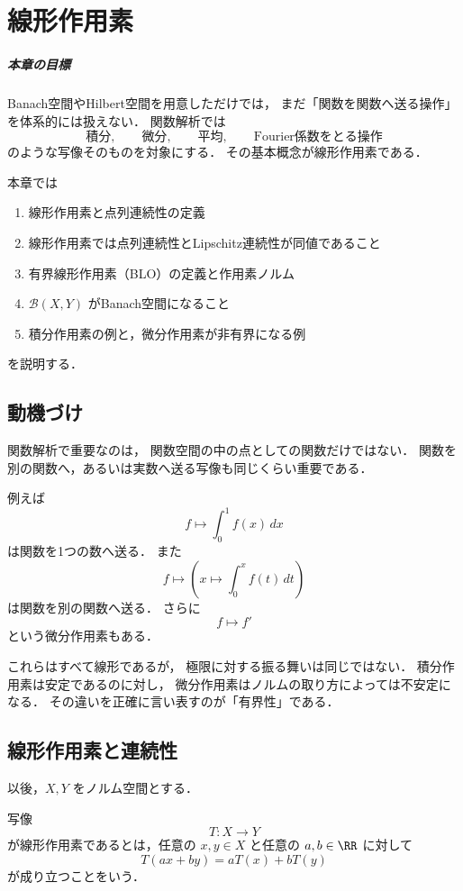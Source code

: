 \setcounter{chapter}{13}
\chapter{線形作用素}

\paragraph{本章の目標}
Banach空間やHilbert空間を用意しただけでは，
まだ「関数を関数へ送る操作」を体系的には扱えない．
関数解析では
\[
\text{積分},\qquad \text{微分},\qquad \text{平均},\qquad \text{Fourier係数をとる操作}
\]
のような写像そのものを対象にする．
その基本概念が線形作用素である．

本章では
\begin{enumerate}
    \item 線形作用素と点列連続性の定義
    \item 線形作用素では点列連続性とLipschitz連続性が同値であること
    \item 有界線形作用素（BLO）の定義と作用素ノルム
    \item $\mathcal B(X,Y)$ がBanach空間になること
    \item 積分作用素の例と，微分作用素が非有界になる例
\end{enumerate}
を説明する．

\section{動機づけ}

関数解析で重要なのは，
関数空間の中の点としての関数だけではない．
関数を別の関数へ，あるいは実数へ送る写像も同じくらい重要である．

例えば
\[
f\longmapsto \int_0^1 f(x)\,dx
\]
は関数を1つの数へ送る．
また
\[
f\longmapsto \left(x\mapsto \int_0^x f(t)\,dt\right)
\]
は関数を別の関数へ送る．
さらに
\[
f\longmapsto f'
\]
という微分作用素もある．

これらはすべて線形であるが，
極限に対する振る舞いは同じではない．
積分作用素は安定であるのに対し，
微分作用素はノルムの取り方によっては不安定になる．
その違いを正確に言い表すのが「有界性」である．

\section{線形作用素と連続性}

以後，$X,Y$ をノルム空間とする．

\begin{definition}[線形作用素]
写像
\[
T:X\to Y
\]
が線形作用素であるとは，任意の $x,y\in X$ と任意の $a,b\in\RR$ に対して
\[
T(ax+by)=aT(x)+bT(y)
\]
が成り立つことをいう．
\end{definition}

